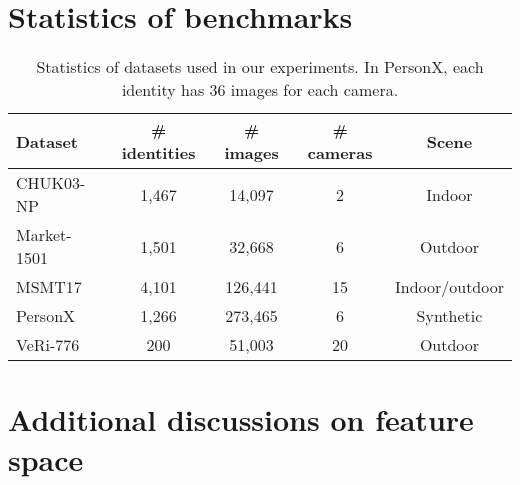 \clearpage


\section{Statistics of benchmarks}
\begin{table}[H]
    \scriptsize
    \centering
    \caption{
        Statistics of datasets used in our experiments. In PersonX, each identity has 36 images for each camera.
    }
    {
    \renewcommand{\arraystretch}{1.1}
    \begin{tabular}{l|cccc}
        \hline
        Dataset & \# identities & \# images & \# cameras & Scene \\
        \hline  \hline
        CHUK03-NP & 1,467 & 14,097 & 2 & Indoor \\
        Market-1501 & 1,501 &  32,668 & 6 & Outdoor \\
        MSMT17 & 4,101 & 126,441 & 15 & Indoor/outdoor \\
        PersonX & 1,266 & 273,465 & 6 & Synthetic \\
        VeRi-776 & 200 & 51,003 & 20 & Outdoor \\
        \hline
    \end{tabular}
    }
    \label{tab:dataset_statistics}
\end{table}

\section{Additional discussions on feature space}
\label{sup:features_space}

